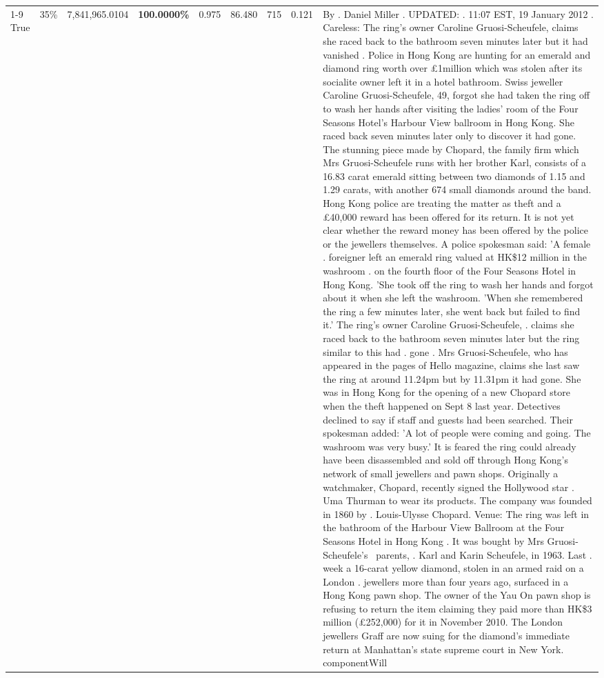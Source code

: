 \begin{table}[H]
\begin{tabular}{lllrlllll}
\cline{1-9} \cline{2-9}
True & 35\% & 7,841,965.0104 & \bfseries \color{red} 100.0000\% & 0.975 & 86.480 & 715 & 0.121 & By . Daniel Miller . UPDATED: . 11:07 EST, 19 January 2012 . Careless: The ring's owner Caroline Gruosi-Scheufele, claims she raced back to the bathroom seven minutes later but it had vanished . Police in Hong Kong are hunting for an emerald and diamond ring worth over £1million which was stolen after its socialite owner left it in a hotel bathroom. Swiss jeweller Caroline Gruosi-Scheufele, 49, forgot she had taken the ring off to wash her hands after visiting the ladies' room of the Four Seasons Hotel's Harbour View ballroom in Hong Kong. She raced back seven minutes later only to discover it had gone. The stunning piece made by Chopard, the family firm which Mrs Gruosi-Scheufele runs with her brother Karl, consists of a 16.83 carat emerald sitting between two diamonds of 1.15 and 1.29 carats, with another 674 small diamonds around the band. Hong Kong police are treating the matter as theft and a £40,000 reward has been offered for its return. It is not yet clear whether the reward money has been offered by the police or the jewellers themselves. A police spokesman said: 'A female . foreigner left an emerald ring valued at HK\$12 million in the washroom . on the fourth floor of the Four Seasons Hotel in Hong Kong. 'She took off the ring to wash her hands and forgot about it when she left the washroom. 'When she remembered the ring a few minutes later, she went back but failed to find it.' The ring's owner Caroline Gruosi-Scheufele, . claims she raced back to the bathroom seven minutes later but the ring similar to this had . gone . Mrs Gruosi-Scheufele, who has appeared in the pages of Hello magazine, claims she last saw the ring at around 11.24pm but by 11.31pm it had gone. She was in Hong Kong for the opening of a new Chopard store when the theft happened on Sept 8 last year. Detectives declined to say if staff and guests had been searched. Their spokesman added: 'A lot of people were coming and going. The washroom was very busy.' It is feared the ring could already have been disassembled and sold off through Hong Kong's network of small jewellers and pawn shops. Originally a watchmaker, Chopard, recently signed the Hollywood star . Uma Thurman to wear its products. The company was founded in 1860 by . Louis-Ulysse Chopard. Venue: The ring was left in the bathroom of the Harbour View Ballroom at the Four Seasons Hotel in Hong Kong . It was bought by Mrs Gruosi-Scheufele's  parents, . Karl and Karin Scheufele, in 1963. Last . week a 16-carat yellow diamond, stolen in an armed raid on a London . jewellers more than four years ago, surfaced in a Hong Kong pawn shop. The owner of the Yau On pawn shop is refusing to return the item claiming they paid more than HK\$3 million (£252,000) for it in November 2010. The London jewellers Graff are now suing for the diamond’s immediate return at Manhattan’s state supreme court in New York. componentWill \\

\end{tabular}
\end{table}
